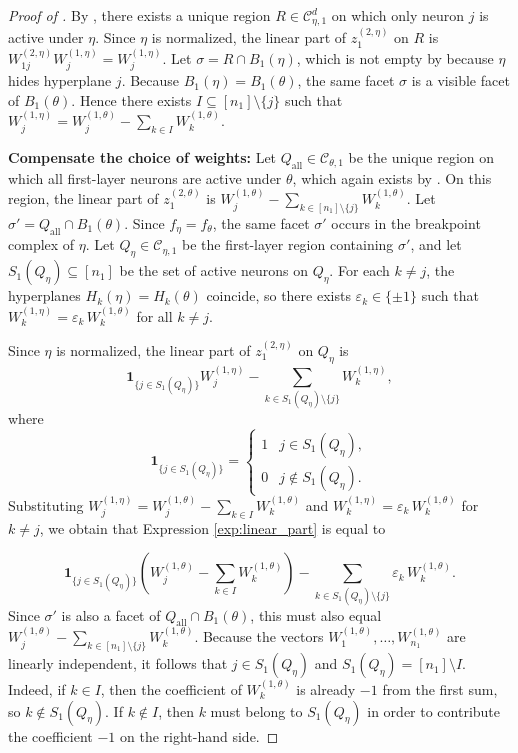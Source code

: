 \documentclass{article}
\theoremstyle{definition}
\newcommand{\weights}[1]{W^{(#1)}}
\newcommand{\complex}{\mathcal{C}}
\newcommand{\preactivation}[1]{z^{(#1)}}
\begin{document}
\begin{proof}[Proof of ]
By , there exists a unique region $R\in\complex_{\eta,1}^d$ on which only neuron $j$ is active under $\eta$. 
Since $\eta$ is normalized, the linear part of $\preactivation{2,\eta}_1$ on $R$ is
$
\weights{2,\eta}_{1j}\weights{1,\eta}_j=\weights{1,\eta}_j
$. 
%
Let $\sigma=R\cap B_1(\eta)$, which is not empty by  because $\eta$ hides hyperplane $j$. 
Because $B_1(\eta)=B_1(\theta)$, the same facet $\sigma$ is a visible facet of $B_1(\theta)$. Hence there exists $I\subseteq[n_1]\setminus\{j\}$ such that
$
\weights{1,\eta}_j
=
\weights{1,\theta}_j-\sum_{k\in I}\weights{1,\theta}_k
$. 

\medskip
\textbf{Compensate the choice of weights:}
Let $Q_{\mathrm{all}}\in\complex_{\theta,1}$ be the unique region on which all first-layer neurons are active under $\theta$, which again exists by . On this region, the linear part of $\preactivation{2,\theta}_1$ is
$
\weights{1,\theta}_j-\sum_{k\in[n_1]\setminus\{j\}}\weights{1,\theta}_k.
$
Let $\sigma'= Q_{\mathrm{all}}\cap B_1(\theta)$. Since $f_\eta=f_\theta$, the same facet $\sigma'$ occurs in the breakpoint complex of $\eta$. 
%
Let $Q_\eta\in\complex_{\eta,1}$ be the first-layer region containing $\sigma'$, and let $S_1(Q_\eta)\subseteq[n_1]$ be the set of active neurons on $Q_\eta$.
For each $k\neq j$, the hyperplanes $H_k(\eta)=H_k(\theta)$ coincide, so there exists $\varepsilon_k\in\{\pm1\}$ such that
$
\weights{1,\eta}_k=\varepsilon_k\,\weights{1,\theta}_k
$
for all $k\neq j$.

Since $\eta$ is normalized, the linear part of $\preactivation{2,\eta}_1$ on $Q_\eta$ is
\begin{equation}\label{exp:linear_part}
    \mathbf{1}_{\{j\in S_1(Q_\eta)\}}\weights{1,\eta}_j
-
\sum_{k\in S_1(Q_\eta)\setminus\{j\}}\weights{1,\eta}_k,
\end{equation}
where $$\mathbf{1}_{\{j \in S_1(Q_\eta)\}} = \begin{cases}
    1 &  j \in S_1(Q_\eta), \\ 
    0 & j \notin S_1(Q_\eta).
\end{cases}$$
Substituting
$
\weights{1,\eta}_j
=
\weights{1,\theta}_j-\sum_{k\in I}\weights{1,\theta}_k
$
and
$
\weights{1,\eta}_k=\varepsilon_k\,\weights{1,\theta}_k
$
for $k\neq j$, we obtain that Expression \ref{exp:linear_part} is equal to

$$
\mathbf{1}_{\{j\in S_1(Q_\eta)\}}
\left(
\weights{1,\theta}_j-\sum_{k\in I}\weights{1,\theta}_k
\right)
-
\sum_{k\in S_1(Q_\eta) \setminus\{j\}}\varepsilon_k\,\weights{1,\theta}_k.
$$
Since $\sigma'$ is also a facet of $Q_{\mathrm{all}}\cap B_1(\theta)$, this must also equal
$
\weights{1,\theta}_j-\sum_{k\in[n_1]\setminus\{j\}}\weights{1,\theta}_k.
$
Because the vectors
$
\weights{1,\theta}_1,\dots,\weights{1,\theta}_{n_1}
$
are linearly independent, it follows that
$
j\in S_1(Q_\eta)
$
and
$S_1(Q_\eta)=[n_1]\setminus I$. 
%
Indeed, if $k\in I$, then the coefficient of $\weights{1,\theta}_k$ is already $-1$ from the first sum, so $k\notin S_1(Q_\eta)$. If $k\notin I$, then $k$ must belong to $S_1(Q_\eta)$ in order to contribute the coefficient $-1$ on the right-hand side.


\end{proof}
\end{document}
